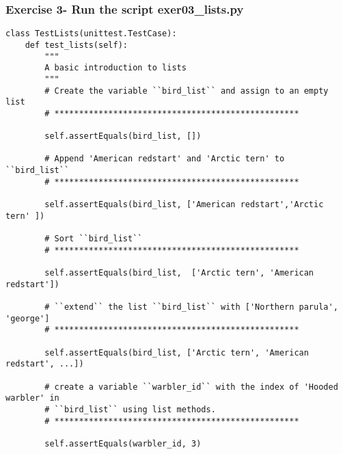 \documentclass{beamer}
\newcommand\Fontvi{\fontsize{6}{7.2}\selectfont}
\begin{document}
\begin{frame}[fragile]
\frametitle{Exercise 3- Run the script exer03\_lists.py}
\Fontvi
\begin{lstlisting}
class TestLists(unittest.TestCase):
    def test_lists(self):
        """
        A basic introduction to lists
        """
        # Create the variable ``bird_list`` and assign to an empty list
        # **************************************************

        self.assertEquals(bird_list, [])

        # Append 'American redstart' and 'Arctic tern' to ``bird_list``
        # **************************************************

        self.assertEquals(bird_list, ['American redstart','Arctic tern' ])

        # Sort ``bird_list``
        # **************************************************

        self.assertEquals(bird_list,  ['Arctic tern', 'American redstart'])

        # ``extend`` the list ``bird_list`` with ['Northern parula', 'george']
        # **************************************************

        self.assertEquals(bird_list, ['Arctic tern', 'American redstart', ...])

        # create a variable ``warbler_id`` with the index of 'Hooded warbler' in
        # ``bird_list`` using list methods.
        # **************************************************

        self.assertEquals(warbler_id, 3)
\end{lstlisting}
\end{frame}
\end{document}

